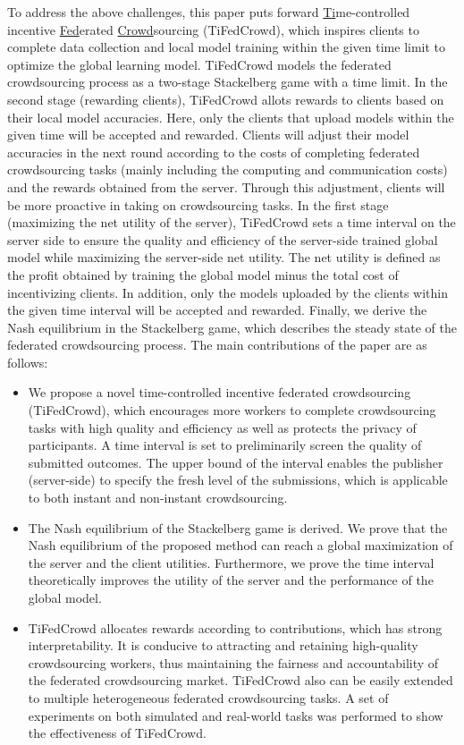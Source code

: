 \documentclass[final,1p,times]{elsarticle}
\begin{document}
To address the above challenges, this paper puts forward \underline{Ti}me-controlled incentive \underline{Fed}erated \underline{Crowd}sourcing (TiFedCrowd), which inspires clients to complete data collection and local model training within the given time limit to optimize the global learning model. TiFedCrowd models the federated crowdsourcing process as a two-stage Stackelberg game \citep{li2017review} with a time limit. In the second stage (rewarding clients), TiFedCrowd allots rewards to clients based on their local model accuracies. Here, only the clients that upload models within the given time will be accepted and rewarded. Clients will adjust their model accuracies in the next round according to the costs of completing federated crowdsourcing tasks (mainly including the computing and communication costs) and the rewards obtained from the server. Through this adjustment, clients will be more proactive in taking on crowdsourcing tasks. In the first stage (maximizing the net utility of the server), TiFedCrowd sets a time interval on the server side to ensure the quality and efficiency of the server-side trained global model while maximizing the server-side net utility. The net utility is defined as the profit obtained by training the global model minus the total cost of incentivizing clients. In addition, only the models uploaded by the clients within the given time interval will be accepted and rewarded. Finally, we derive the Nash equilibrium in the Stackelberg game, which describes the steady state of the federated crowdsourcing process. The main contributions of the paper are as follows: 

\begin{itemize}
	\item We propose a novel time-controlled incentive federated crowdsourcing (TiFedCrowd), which encourages more workers to complete crowdsourcing tasks with high quality and efficiency as well as protects the privacy of participants. A time interval is set to preliminarily screen the quality of submitted outcomes. The upper bound of the interval enables the publisher (server-side) to specify the fresh level of the submissions, which is applicable to both instant and non-instant crowdsourcing.
	\item The Nash equilibrium of the Stackelberg game is derived. We prove that the Nash equilibrium of the proposed method can reach a  global maximization of the server and the client utilities. Furthermore, we prove the time interval theoretically improves the utility of the server and the performance of the global model.
	\item TiFedCrowd allocates rewards according to contributions, which has strong interpretability. It is conducive to attracting and retaining high-quality crowdsourcing workers, thus maintaining the fairness and accountability of the federated crowdsourcing market. TiFedCrowd also can be easily extended to multiple heterogeneous federated crowdsourcing tasks. A set of experiments on both simulated and real-world tasks was performed to show the effectiveness of TiFedCrowd.
\end{itemize}
\end{document}

